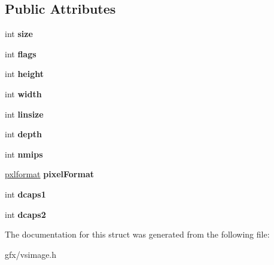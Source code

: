 \subsection*{Public Attributes}
\begin{DoxyCompactItemize}
\item 
int {\bfseries size}\hypertarget{structddsHeader_a826dc443204fd72ff5b38b6b4f508aeb}{}\label{structddsHeader_a826dc443204fd72ff5b38b6b4f508aeb}

\item 
int {\bfseries flags}\hypertarget{structddsHeader_a8c05b0acfd51fad3415db764609fc103}{}\label{structddsHeader_a8c05b0acfd51fad3415db764609fc103}

\item 
int {\bfseries height}\hypertarget{structddsHeader_a050fe3f7f7972cd1a886890f365c47d0}{}\label{structddsHeader_a050fe3f7f7972cd1a886890f365c47d0}

\item 
int {\bfseries width}\hypertarget{structddsHeader_aa28759d082116ce8db4bb19893a74f9f}{}\label{structddsHeader_aa28759d082116ce8db4bb19893a74f9f}

\item 
int {\bfseries linsize}\hypertarget{structddsHeader_af54d5ccb7e1756d53f5f4946b78d024f}{}\label{structddsHeader_af54d5ccb7e1756d53f5f4946b78d024f}

\item 
int {\bfseries depth}\hypertarget{structddsHeader_a1eff7f04cbd2020c5695d16dc4c8043a}{}\label{structddsHeader_a1eff7f04cbd2020c5695d16dc4c8043a}

\item 
int {\bfseries nmips}\hypertarget{structddsHeader_ad8bebbe73dc30cc553cb96574e6f8394}{}\label{structddsHeader_ad8bebbe73dc30cc553cb96574e6f8394}

\item 
\hyperlink{structpxlformat}{pxlformat} {\bfseries pixel\+Format}\hypertarget{structddsHeader_a2a4be1d994641445ec4a22cdfa2e2349}{}\label{structddsHeader_a2a4be1d994641445ec4a22cdfa2e2349}

\item 
int {\bfseries dcaps1}\hypertarget{structddsHeader_a5e46bb6cb424bc619c08a0b6baa7f33d}{}\label{structddsHeader_a5e46bb6cb424bc619c08a0b6baa7f33d}

\item 
int {\bfseries dcaps2}\hypertarget{structddsHeader_ac128f5d26e279ddef25dc36d6fa04a48}{}\label{structddsHeader_ac128f5d26e279ddef25dc36d6fa04a48}

\end{DoxyCompactItemize}


The documentation for this struct was generated from the following file\+:\begin{DoxyCompactItemize}
\item 
gfx/vsimage.\+h\end{DoxyCompactItemize}
